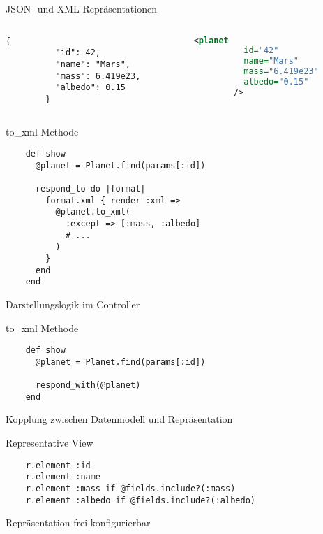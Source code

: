 \begin{Frame}[fragile]{JSON- und XML-Repräsentationen}

  \begin{columns}[t]
    \begin{column}{.45\textwidth}
      \begin{lstlisting}[language={},gobble=8]
        {
          "id": 42,
          "name": "Mars",
          "mass": 6.419e23,
          "albedo": 0.15
        }
      \end{lstlisting}
    \end{column}
    \begin{column}{.45\textwidth}
      \begin{lstlisting}[language=XML,gobble=8]
        <planet
          id="42"
          name="Mars"
          mass="6.419e23"
          albedo="0.15"
        />
      \end{lstlisting}
    \end{column}
  \end{columns}
\end{Frame}

\begin{Frame}[fragile]{to\_xml Methode}
  \begin{lstlisting}
    def show
      @planet = Planet.find(params[:id])

      respond_to do |format|
        format.xml { render :xml =>
          @planet.to_xml(
            :except => [:mass, :albedo]
            # ...
          )
        }
      end
    end
  \end{lstlisting}

  Darstellungslogik im Controller \badmark
\end{Frame}

\begin{Frame}[fragile]{to\_xml Methode}
  \begin{lstlisting}
    def show
      @planet = Planet.find(params[:id])

      respond_with(@planet)
    end
  \end{lstlisting}

  Kopplung zwischen Datenmodell und Repräsentation \badmark
\end{Frame}

\begin{Frame}[fragile]{Representative View}
  \begin{lstlisting}
    r.element :id
    r.element :name
    r.element :mass if @fields.include?(:mass)
    r.element :albedo if @fields.include?(:albedo)
  \end{lstlisting}

  Repräsentation frei konfigurierbar \goodmark
\end{Frame}

